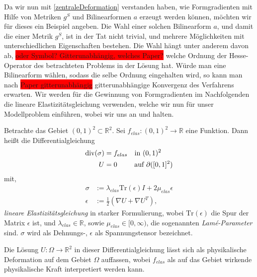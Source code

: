 Da wir nun mit \ref{zentraleDeformation} verstanden haben, wie Formgradienten mit Hilfe von Metriken $g^S$ und Bilinearformen $a$ erzeugt werden können, möchten wir für dieses ein Beispiel angeben. Die Wahl einer solchen Bilinearform $a$, und damit die einer Metrik $g^S$, ist in der Tat nicht trivial, und mehrere Möglichkeiten mit unterschiedlichen Eigenschaften bestehen. Die Wahl hängt unter anderem davon ab,
\colorbox{red}{oder Symbol? Gitterunabhängig, welches Paper?} welche Ordnung der Hesse-Operator des betrachteten Problems in der Lösung hat. Würde man eine Bilinearform wählen, sodass die selbe Ordnung eingehalten wird, so kann man nach \colorbox{red}{Paper gitterunabhängig} gitterunabhängige Konvergenz des Verfahrens erwarten. Wir werden für die Gewinnung von Formgradienten im Nachfolgenden die lineare Elastizitätsgleichung verwenden, welche wir nun für unser Modellproblem einführen, wobei wir uns an \cite{bfgs1} und \cite{bfgs2} halten. 

\begin{defi}
	Betrachte das Gebiet $(0,1)^2 \subset \mathbb{R}^2$. Sei $f_{elas}: (0,1)^2 \rightarrow \mathbb{R}$ eine Funktion. Dann heißt die Differentialgleichung
	\begin{equation}\label{linelas}
		\begin{aligned}
		\text{div}(\sigma) &= f_{elas} \quad \text{in } (0,1)^2 \\
		U &= 0 \quad \hspace{0.2cm} \;\;\text{ auf } \partial([0,1]^2)
		\end{aligned}
	\end{equation}	 
	mit,
	\begin{align*}
		\sigma &:= \lambda_{elas} \text{Tr}(\epsilon)I + 2\mu_{elas}\epsilon \\
		\epsilon &:= \frac{1}{2}(\nabla U + \nabla U^T),
	\end{align*}
	\textit{lineare Elastizitätsgleichung} in starker Formulierung, wobei $\text{Tr}(\epsilon)$ die Spur der Matrix $\epsilon$ ist, und $\lambda_{elas} \in \mathbb{R}$, sowie $\mu_{elas} \in [0,\infty)$, die sogenannten \textit{Lamé-Parameter} sind. $\sigma$ wird als Dehnungs-, $\epsilon$ als Spannungstensor bezeichnet. 
\end{defi}

Die Lösung $U: \Omega \rightarrow \mathbb{R}^2$ in dieser Differentialgleichung lässt sich als physikalische Deformation auf dem Gebiet $\Omega$ auffassen, wobei $f_{elas}$ als auf das Gebiet wirkende physikalische Kraft interpretiert werden kann. 

